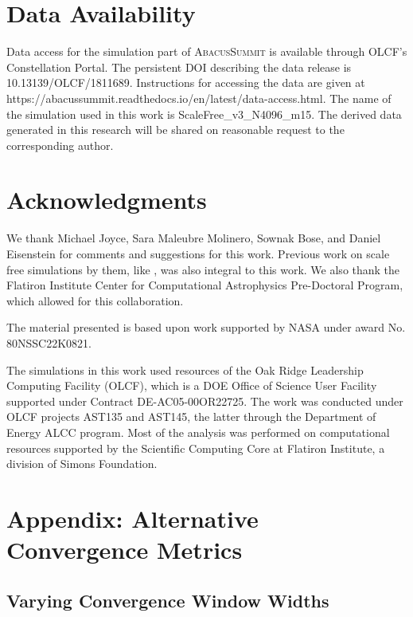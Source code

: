 \section*{Data Availability}
Data access for the simulation part of \textsc{AbacusSummit} is available through OLCF’s Constellation Portal. The persistent DOI describing the data release is 10.13139/OLCF/1811689. Instructions for accessing the data are given at https://abacussummit.readthedocs.io/en/latest/data-access.html. The name of the simulation used in this work is ScaleFree\_v3\_N4096\_m15. The derived data generated in this research will be shared on reasonable request to the corresponding author.

\section*{Acknowledgments}

We thank Michael Joyce, Sara Maleubre Molinero, Sownak Bose, and Daniel Eisenstein for comments and suggestions for this work. Previous work on scale free simulations by them, like \cite{Maleubre_2024}, was also integral to this work. We also thank the Flatiron Institute Center for Computational Astrophysics Pre-Doctoral Program, which allowed for this collaboration.

The material presented is based upon work supported by NASA under award No. 80NSSC22K0821.

The simulations in this work used resources of the Oak Ridge Leadership Computing Facility (OLCF), which is a DOE Office of Science User Facility supported under Contract DE-AC05-00OR22725. The work was conducted under OLCF projects AST135 and AST145, the latter through the Department of Energy ALCC program. Most of the analysis was performed on computational resources supported by the Scientific Computing Core at Flatiron Institute, a division of Simons Foundation.


\section*{Appendix: Alternative Convergence Metrics}\label{alternative_convergence_metrics}
\subsection{Varying Convergence Window Widths}\label{varying_bin_width}


